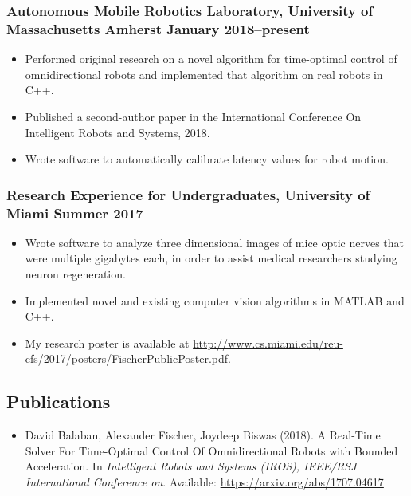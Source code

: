 \documentclass{article}
\begin{document}
			\subsubsection*{Autonomous Mobile Robotics Laboratory, University of Massachusetts Amherst \hfill \normalfont \normalsize January 2018--present}
			\begin{itemize}[noitemsep,leftmargin=40pt]
				\item Performed original research on a novel algorithm for time-optimal control of omnidirectional robots and implemented that algorithm on real robots in C++.
				\item Published a second-author paper in the International Conference On Intelligent Robots and Systems, 2018.
				\item Wrote software to automatically calibrate latency values for robot motion.
			\end{itemize}
			\subsubsection*{Research Experience for Undergraduates, University of Miami \hfill \normalfont \normalsize Summer 2017}
			\begin{itemize}[noitemsep,leftmargin=40pt]
				\item Wrote software to analyze three dimensional images of mice optic nerves that were multiple gigabytes each, in order to assist medical researchers studying neuron regeneration.
				\item Implemented novel and existing computer vision algorithms in MATLAB and C++.
				\item My research poster is available at \href{http://www.cs.miami.edu/reu-cfs/2017/posters/FischerPublicPoster.pdf}{http://www.cs.miami.edu/reu-cfs/2017/posters/FischerPublicPoster.pdf}.
			\end{itemize}
			\subsection*{Publications}
			\begin{itemize}[noitemsep,leftmargin=40pt]
				\item David Balaban, Alexander Fischer, Joydeep Biswas (2018). A Real-Time Solver For Time-Optimal Control Of Omnidirectional Robots with Bounded Acceleration. In \textit{Intelligent Robots and Systems (IROS), IEEE/RSJ International Conference on}. Available: \href{https://arxiv.org/abs/1707.04617}{https://arxiv.org/abs/1707.04617}
			\end{itemize}
\end{document}
